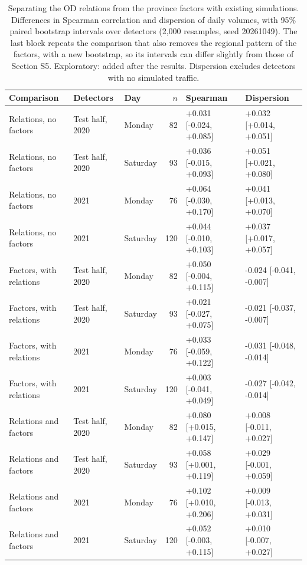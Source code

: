 \begin{table}[htbp]\centering
\caption{Separating the OD relations from the province factors with existing simulations. Differences in Spearman correlation and dispersion of daily volumes, with 95\% paired bootstrap intervals over detectors (2,000 resamples, seed 20261049). The last block repeats the comparison that also removes the regional pattern of the factors, with a new bootstrap, so its intervals can differ slightly from those of Section S5. Exploratory: added after the results. Dispersion excludes detectors with no simulated traffic.}
\label{tab:od_decomposition}
\small
\begin{tabular}{@{}lllrll@{}}\toprule
Comparison & Detectors & Day & $n$ & Spearman & Dispersion \\\midrule
Relations, no factors & Test half, 2020 & Monday & 82 & +0.031 [-0.024, +0.085] & +0.032 [+0.014, +0.051] \\
Relations, no factors & Test half, 2020 & Saturday & 93 & +0.036 [-0.015, +0.093] & +0.051 [+0.021, +0.080] \\
Relations, no factors & 2021 & Monday & 76 & +0.064 [-0.030, +0.170] & +0.041 [+0.013, +0.070] \\
Relations, no factors & 2021 & Saturday & 120 & +0.044 [-0.010, +0.103] & +0.037 [+0.017, +0.057] \\
Factors, with relations & Test half, 2020 & Monday & 82 & +0.050 [-0.004, +0.115] & -0.024 [-0.041, -0.007] \\
Factors, with relations & Test half, 2020 & Saturday & 93 & +0.021 [-0.027, +0.075] & -0.021 [-0.037, -0.007] \\
Factors, with relations & 2021 & Monday & 76 & +0.033 [-0.059, +0.122] & -0.031 [-0.048, -0.014] \\
Factors, with relations & 2021 & Saturday & 120 & +0.003 [-0.041, +0.049] & -0.027 [-0.042, -0.014] \\
Relations and factors & Test half, 2020 & Monday & 82 & +0.080 [+0.015, +0.147] & +0.008 [-0.011, +0.027] \\
Relations and factors & Test half, 2020 & Saturday & 93 & +0.058 [+0.001, +0.119] & +0.029 [-0.001, +0.059] \\
Relations and factors & 2021 & Monday & 76 & +0.102 [+0.010, +0.206] & +0.009 [-0.013, +0.031] \\
Relations and factors & 2021 & Saturday & 120 & +0.052 [-0.003, +0.115] & +0.010 [-0.007, +0.027] \\
\bottomrule\end{tabular}
\end{table}
